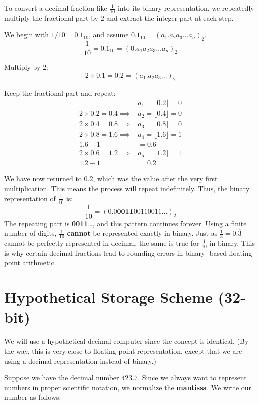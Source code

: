 To convert a decimal fraction like $\frac{1}{10}$ into its binary 
representation, we repeatedly multiply the fractional part by $2$ and extract
the integer part at each step.

We begin with $1/10 = 0.1_{10}$, and assume $0.1_{10} = (a_1.a_2a_3\dots
a_n)_2$.
\[
\frac{1}{10} = 0.1_{10} = (0.a_1a_2a_3\dots a_n)_{2}
\]

Multiply by $2$:
\[
2 \times 0.1 = 0.2 = (a_1.a_2a_3\dots)_2
\]

Keep the fractional part and repeat:
\begin{align*}
  &a_1 = \lfloor 0.2 \rfloor = 0 \\
  2 \times 0.2 = 0.4 \implies &a_2 = \lfloor 0.4 \rfloor = 0 \\
  2 \times 0.4 = 0.8 \implies &a_3 = \lfloor 0.8 \rfloor = 0 \\
  2 \times 0.8 = 1.6 \implies &a_4 = \lfloor 1.6 \rfloor = 1 \\
  1.6 - 1 &= 0.6 \\
  2 \times 0.6 = 1.2 \implies &a_5 = \lfloor 1.2 \rfloor = 1 \\
  1.2 - 1 &= 0.2
\end{align*}

We have now returned to $0.2$, which was the value after the very first 
multiplication. This means the process will repeat indefinitely. Thus, the 
binary representation of $\frac{1}{10}$ is:
\[
  \frac{1}{10} = (0.0\mathbf{0011}00110011\dots)_2
\]
The repeating part is \textbf{0011}\dots, and this pattern continues forever. 
Using a finite number of digits, $\frac{1}{10}$ \textbf{cannot} be represented
exactly in binary. Just as $\frac{1}{3} = 0.\overline{3}$ cannot
be perfectly represented in decimal, the same is true for $\frac{1}{10}$ in
binary. This is why certain decimal fractions lead to rounding errors in binary-
based floating-point arithmetic.

\section{Hypothetical Storage Scheme (32-bit)}

We will use a hypothetical decimal computer since the concept is identical.
(By the way, this is very close to 
 floating point
representation, except that we are using a decimal representation instead of
binary.)

Suppose we have the decimal number $423.7$. Since we always want to represent
numbers in proper scientific notation, we normalize the
\textbf{mantissa}.
We write our number as follows:

